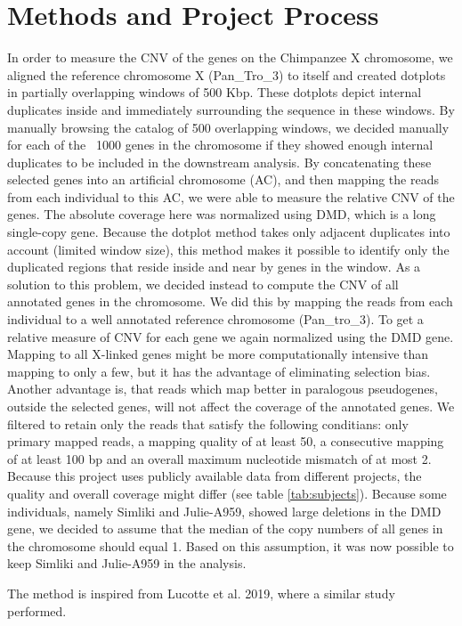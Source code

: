 \section*{Methods and Project Process}
In order to measure the CNV of the genes on the Chimpanzee X chromosome, we aligned the reference chromosome X (Pan\_Tro\_3) to itself and created dotplots in partially overlapping windows of 500 Kbp. These dotplots depict internal duplicates inside and immediately surrounding the sequence in these windows. By manually browsing the catalog of 500 overlapping windows, we decided manually for each of the ~1000 genes in the chromosome if they showed enough internal duplicates to be included in the downstream analysis. By concatenating these selected genes into an artificial chromosome (AC), and then mapping the reads from each individual to this AC, we were able to measure the relative CNV of the genes. The absolute coverage here was normalized using DMD, which is a long single-copy gene. Because the dotplot method takes only adjacent duplicates into account (limited window size), this method makes it possible to identify only the duplicated regions that reside inside and near by genes in the window. As a solution to this problem, we decided instead to  compute the CNV of all annotated genes in the chromosome. We did this by mapping the reads from each individual to a well annotated reference chromosome (Pan\_tro\_3). To get a relative measure of CNV for each gene we again normalized using the DMD gene. Mapping to all X-linked genes might be more computationally intensive than mapping to only a few, but it has the advantage of eliminating selection bias. Another advantage is, that reads which map better in paralogous pseudogenes, outside the selected genes, will not affect the coverage of the annotated genes. We filtered to retain only the reads that satisfy the following conditians: only primary mapped reads, a mapping quality of at least 50, a consecutive mapping of at least 100 bp and an overall maximum nucleotide mismatch of at most 2. Because this project uses publicly available data from different projects, the quality and overall coverage might differ (see table \ref{tab:subjects}). Because some individuals, namely Simliki and Julie-A959, showed large deletions in the DMD gene, we decided to assume that the median of the copy numbers of all genes in the chromosome should equal 1. Based on this assumption, it was now possible to keep Simliki and Julie-A959 in the analysis.

The method is inspired from Lucotte et al. 2019\cite{Lucotte907}, where a similar study performed.